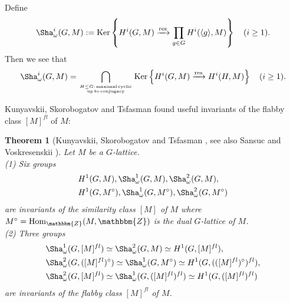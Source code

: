 \documentclass{amsart}
\theoremstyle{plain}
\newtheorem{theorem}{Theorem}[section]
\theoremstyle{definition}
\theoremstyle{remark}
\newcommand{\bZ}{\mathbbm{Z}}\newcommand{\bQ}{\mathbbm{Q}}
\begin{document}
Define 
\begin{align*}
{\Sha}^i_\omega (G,M):=
{\rm Ker}\left\{H^i(G,M)\xrightarrow{\rm res}\prod_{g\in G}
H^i(\langle g\rangle,M)\right\}\quad (i \geq 1).
\end{align*}
Then we see that 
\begin{align*}
{\Sha}^i_\omega (G,M)=
\bigcap_{H\leq G:\, {\rm maximal\, cyclic}\atop {\rm up\, to\, conjugacy}}{\rm Ker}\left\{H^i(G,M)\xrightarrow{\rm res}H^i(H,M)\right\}\quad (i \geq 1).
\end{align*}

Kunyavskii, Skorobogatov and Tsfasman 
\cite{KST89} found useful invariants of the flabby class $[M]^{fl}$ of $M$:
%
\begin{theorem}[Kunyavskii, Skorobogatov and Tsfasman 
{\cite[pages 26--27, 36--37]{KST89}, see also Sansuc \cite[Section 9]{San81} and Voskresenskii \cite[Section 12]{Vos98}}]
Let $M$ be a $G$-lattice.\\
{\rm (1)} Six groups 
\begin{align*}
&H^1(G,M), {\Sha}^1_\omega (G,M), {\Sha}^2_\omega (G,M),\\ 
&H^1(G,M^\circ), {\Sha}^1_\omega (G,M^\circ), {\Sha}^2_\omega (G,M^\circ)
\end{align*}
are invariants of the similarity class $[M]$ of $M$ 
where $M^\circ={\rm Hom}_\bZ(M,\bZ)$ is the dual $G$-lattice of $M$.\\
{\rm (2)} Three groups 
\begin{align*}
&\Sha^1_\omega(G,[M]^{fl})\simeq \Sha^2_\omega(G,M)\simeq H^1(G,[M]^{fl}),\\
&\Sha^2_\omega(G,([M]^{fl})^\circ)\simeq \Sha^1_\omega(G,M^\circ)\simeq 
H^1(G,(([M]^{fl})^\circ)^{fl}),\\
&\Sha^2_\omega(G,[M]^{fl})\simeq  \Sha^1_\omega(G,([M]^{fl})^{fl})\simeq 
H^1(G, ([M]^{fl})^{fl})
\end{align*}
are invariants of the flabby class $[M]^{fl}$ of $M$.
\end{theorem}
\end{document}

